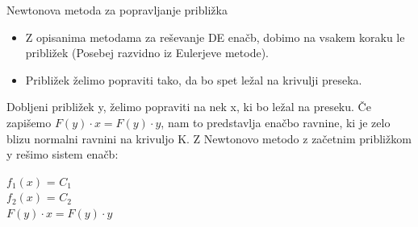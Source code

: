 \documentclass{beamer}
\begin{document}
	\begin{frame}{Newtonova metoda za popravljanje približka}
		\begin{itemize}
			\item Z opisanima metodama za reševanje DE enačb, dobimo na vsakem koraku le približek (Posebej razvidno iz Eulerjeve metode).
			\item Približek želimo popraviti tako, da bo spet ležal na krivulji preseka.
		\end{itemize}
		Dobljeni približek y, želimo popraviti na nek x, ki bo ležal na preseku. Če zapišemo $F(y) \cdot x = F(y)\cdot y $, nam to predstavlja enačbo ravnine, ki je zelo blizu normalni ravnini na krivuljo K. Z Newtonovo metodo z začetnim približkom y rešimo sistem enačb:
		\begin{center}
			$f_{1}(x)$ = $C_{1}$\\$f_{2}(x)$ = $C_{2}$\\ $F(y) \cdot x = F(y)\cdot y $
		\end{center}
	\end{frame}
	
\end{document}
